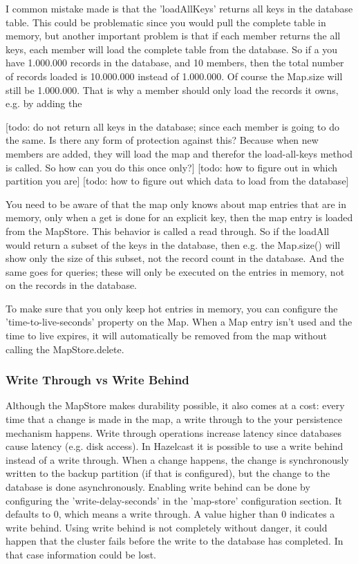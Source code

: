 I common mistake made is that the 'loadAllKeys' returns all keys in the database table. This could be problematic since you would pull the complete table in memory, but another important problem is that if each member returns the all keys, each member will load the complete table from the database. So if a you have 1.000.000 records in the database, and 10 members, then the total number of records loaded is 10.000.000 instead of 1.000.000. Of course the Map.size will still be 1.000.000. That is why a member should only load the records it owns, e.g. by adding the 

[todo: do not return all keys in the database; since each member is going to do the same. Is there any form of protection against this? Because when new members are added, they will load the map and therefor the load-all-keys method is called. So how can you do this once only?]
[todo: how to figure out in which partition you are]
[todo: how to figure out which data to load from the database]

You need to be aware of that the map only knows about map entries that are in memory, only when a get is done for an explicit key, then the map entry is loaded from the MapStore. This behavior is called a read through. So if the loadAll would return a subset of the keys in the database, then e.g. the Map.size() will show only the size of this subset, not the record count in the database. And the same goes for queries; these will only be executed on the entries in memory, not on the records in the database.

To make sure that you only keep hot entries in memory, you can configure the 'time-to-live-seconds' property on the Map. When a Map entry isn't used and the time to live expires, it will automatically be removed from the map without calling the MapStore.delete. 

\subsubsection*{Write Through vs Write Behind}
Although the MapStore makes durability possible, it also comes at a cost: every time that a change is made in the map, a write through to the your persistence mechanism happens. Write through operations increase latency since databases cause latency (e.g. disk access). In Hazelcast it is possible to use a write behind instead of a write through. When a change happens, the change is synchronously written to the backup partition (if that is configured), but the change to the database is done asynchronously. Enabling write behind can be done by configuring the 'write-delay-seconds' in the 'map-store' configuration section. It defaults to 0, which means a write through. A value higher than 0 indicates a write behind. Using write behind is not completely without danger, it could happen that the cluster fails before the write to the database has completed. In that case information could be lost.

